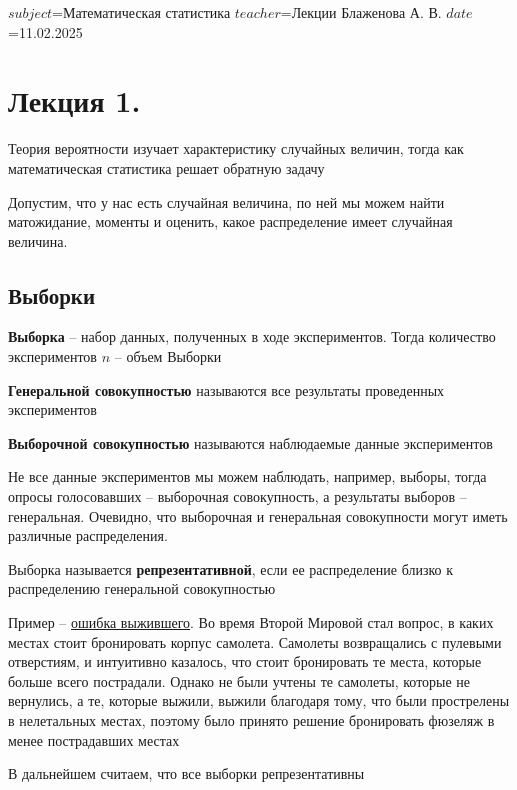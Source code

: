 $subject$=Математическая статистика
$teacher$=Лекции Блаженова А. В.
$date$=11.02.2025

\section{Лекция 1.}

Теория вероятности изучает характеристику случайных величин, тогда как математическая статистика решает обратную задачу

Допустим, что у нас есть случайная величина, по ней мы можем найти матожидание, моменты и оценить,
какое распределение имеет случайная величина. 

\subsection{Выборки}

\Def \textbf{Выборка} -- набор данных, полученных в ходе экспериментов. Тогда количество экспериментов $n$ -- объем Выборки

\Defs \textbf{Генеральной совокупностью} называются все результаты проведенных экспериментов

\Defs \textbf{Выборочной совокупностью} называются наблюдаемые данные экспериментов

Не все данные экспериментов мы можем наблюдать, например, выборы, тогда опросы голосовавших -- выборочная совокупность, а
результаты выборов -- генеральная. Очевидно, что выборочная и генеральная совокупности могут иметь различные распределения.

\Defs Выборка называется \textbf{репрезентативной}, если ее распределение близко к распределению генеральной совокупностью

Пример -- \href{https://ru.wikipedia.org/wiki/%D0%A1%D0%B8%D1%81%D1%82%D0%B5%D0%BC%D0%B0%D1%82%D0%B8%D1%87%D0%B5%D1%81%D0%BA%D0%B0%D1%8F_%D0%BE%D1%88%D0%B8%D0%B1%D0%BA%D0%B0_%D0%B2%D1%8B%D0%B6%D0%B8%D0%B2%D1%88%D0%B5%D0%B3%D0%BE}{ошибка выжившего}. Во время Второй Мировой стал вопрос, в каких местах стоит бронировать корпус самолета. Самолеты 
возвращались с пулевыми отверстиям, и интуитивно казалось, что стоит бронировать те места, которые больше
всего пострадали. Однако не были учтены те самолеты, которые не вернулись, а те, которые выжили, выжили благодаря тому, что были 
прострелены в нелетальных местах, поэтому было принято решение бронировать фюзеляж в менее пострадавших местах

В дальнейшем считаем, что все выборки репрезентативны


